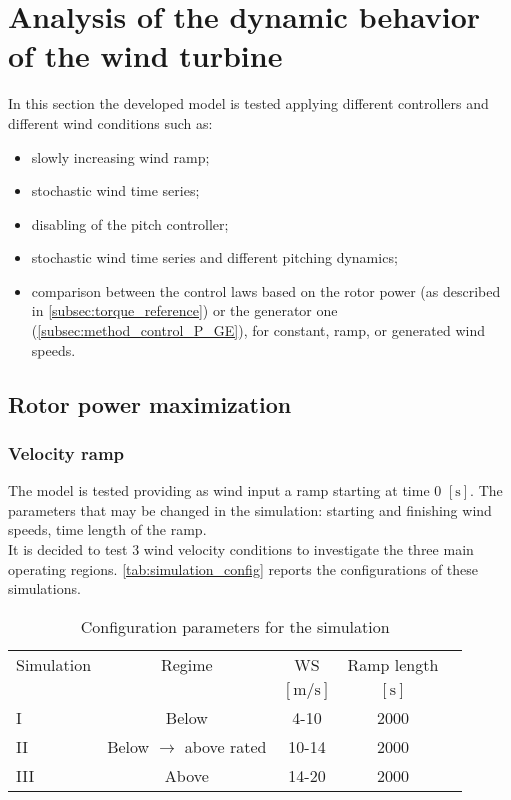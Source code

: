 \newpage
\section{Analysis of the dynamic behavior of the wind turbine}\label{sec:c_basic_model_simulation}
In this section the developed model is tested applying different controllers and different wind conditions such as:
\begin{itemize}
  \item slowly increasing wind ramp;
  \item stochastic wind time series;
  \item disabling of the pitch controller;
  \item stochastic wind time series and different pitching dynamics;
  \item comparison between the control laws based on the rotor power (as described in \autoref{subsec:torque_reference}) or the generator one (\autoref{subsec:method_control_P_GE}), for constant, ramp, or generated wind speeds.
\end{itemize}

                                                  
\subsection{Rotor power maximization}
\subsubsection{Velocity ramp}
The model is tested providing as wind input a ramp starting at time 0 $\left[\si{\second}\right]$. The parameters that may be changed in the simulation: starting and finishing wind speeds, time length of the ramp.\\
It is decided to test 3 wind velocity conditions to investigate the three main operating regions. \autoref{tab:simulation_config} reports the configurations of these simulations. 
\begin{table}[htb]
    \caption{Configuration parameters for the simulation}
    \centering
    \begin{tabular}{lcccc}
    \toprule
      Simulation & Regime  & WS & Ramp length \\ 
       & & $\left[\si{\meter\per\second}\right]$ & $\left[\si{\second}\right]$ \\ \midrule       
       I & Below & 4-10 & 2000  \\
       II & Below $\rightarrow$ above rated & 10-14 & 2000 \\
       III & Above & 14-20 & 2000  \\
       \bottomrule
    \end{tabular}
    \label{tab:simulation_config}
\end{table}

